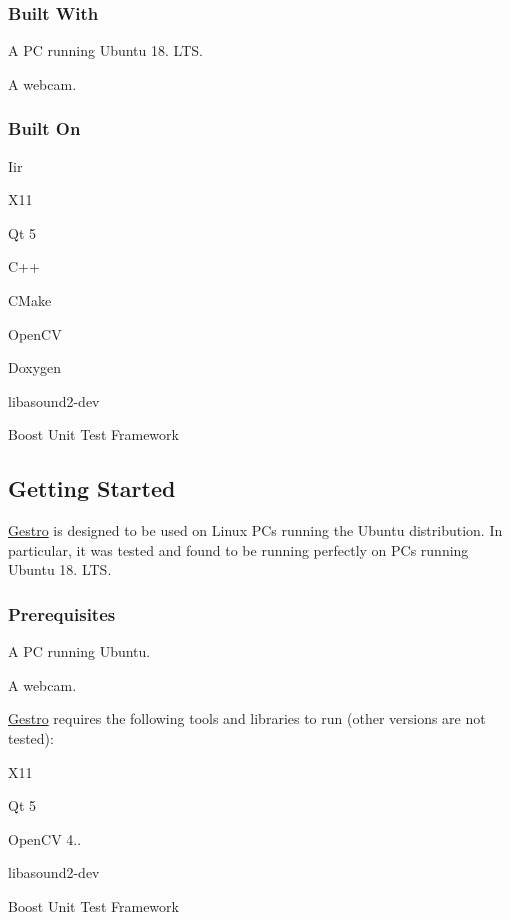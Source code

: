 \subsubsection*{Built With}


\begin{DoxyItemize}
\item A PC running Ubuntu 18. L\+TS.
\item A webcam.
\end{DoxyItemize}

\subsubsection*{Built On}


\begin{DoxyItemize}
\item Iir
\item X11
\item Qt 5
\item C++
\item C\+Make
\item Open\+CV
\item Doxygen
\item libasound2-\/dev
\item Boost Unit Test Framework
\end{DoxyItemize}

\subsection*{Getting Started}

\hyperlink{namespace_gestro}{Gestro} is designed to be used on Linux P\+Cs running the Ubuntu distribution. In particular, it was tested and found to be running perfectly on P\+Cs running Ubuntu 18. L\+TS.

\subsubsection*{Prerequisites}


\begin{DoxyItemize}
\item A PC running Ubuntu.
\item A webcam.
\end{DoxyItemize}

\hyperlink{namespace_gestro}{Gestro} requires the following tools and libraries to run (other versions are not tested)\+:
\begin{DoxyItemize}
\item X11
\item Qt 5
\item Open\+CV 4..
\item libasound2-\/dev
\item Boost Unit Test Framework
\end{DoxyItemize}

